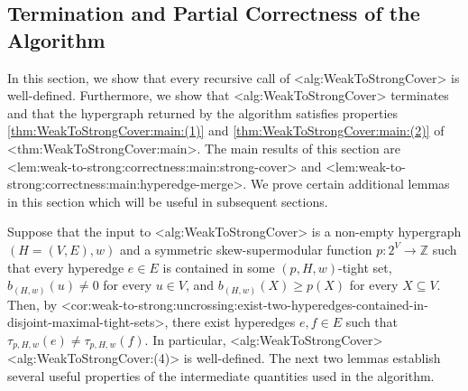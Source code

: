\documentclass{article}
\def\Cref#1{<#1>}%
\newcommand{\knote}[1]{{\color{red}[{\tiny Karthik: \bf #1}]\marginpar{\color{red}*}}}
\newcommand{\maximalTightSetContainingHyperedge}[1]{\ensuremath{\tau_{#1}}\xspace}
\providecommand{\Z}{\mathbb{Z}}
\begin{document}
\subsection{Termination and Partial Correctness of the Algorithm}
\label{sec:WeakToStrongCover:PartialCorrectness}
In this section, we show that every recursive call of \Cref{alg:WeakToStrongCover} is well-defined. 
Furthermore, we show that \Cref{alg:WeakToStrongCover} terminates and that the hypergraph returned by the algorithm satisfies properties \ref{thm:WeakToStrongCover:main:(1)} and \ref{thm:WeakToStrongCover:main:(2)} of \Cref{thm:WeakToStrongCover:main}. The main results of this section are \Cref{lem:weak-to-strong:correctness:main:strong-cover} and \Cref{lem:weak-to-strong:correctness:main:hyperedge-merge}. We prove certain additional lemmas in this section which will be useful in subsequent sections. 
 
    Suppose that the input to \Cref{alg:WeakToStrongCover} is a non-empty hypergraph $(H = (V, E), w)$ and a symmetric skew-supermodular function $p:2^V\rightarrow \Z$ 
such that every hyperedge $e \in E$ is contained in some $(p, H, w)$-tight set, $b_{(H,w)}(u) \not = 0$ for every $u \in V$, and $b_{(H,w)}(X) \geq p(X)$ for every $X \subseteq V$. 
  Then, by \Cref{cor:weak-to-strong:uncrossing:exist-two-hyperedges-contained-in-disjoint-maximal-tight-sets}, there exist hyperedges $e , f \in E$ such that $\maximalTightSetContainingHyperedge{p, H, w}(e) \not = \maximalTightSetContainingHyperedge{p, H, w}(f)$. In particular, \Cref{alg:WeakToStrongCover} \Cref{alg:WeakToStrongCover:(4)} is well-defined. 
  The next two lemmas establish several useful properties of the intermediate quantities used in the algorithm.
\end{document}
